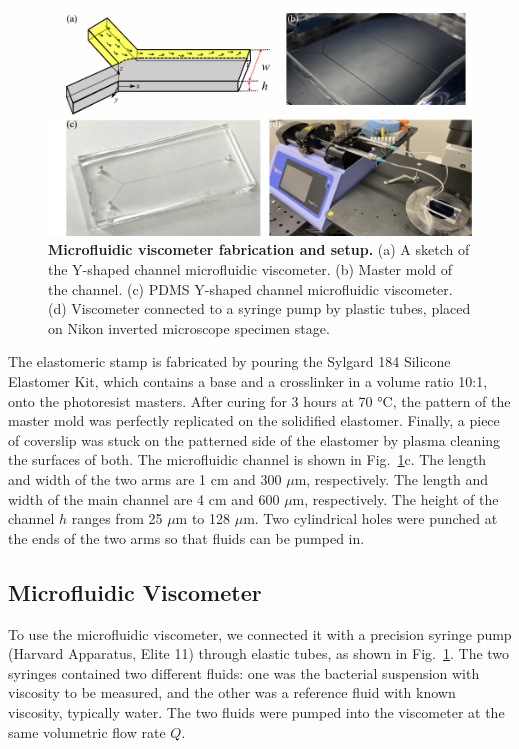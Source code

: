 \begin{figure}[!h]
	\begin{center}
	\includegraphics[width=5.5 in]{Figs/2-Exp/7.pdf}
	\end{center}
	\caption[Microfluidic viscometer fabrication and setup.]
	{
	\textbf{Microfluidic viscometer fabrication and setup.}
	(a) A sketch of the Y-shaped channel microfluidic viscometer.
	(b) Master mold of the channel.
	(c) PDMS Y-shaped channel microfluidic viscometer.
	(d) Viscometer connected to a syringe pump by plastic tubes, placed on Nikon inverted microscope specimen stage.
	}
	\label{fig:experiment-microfluidics}
\end{figure}

The elastomeric stamp is fabricated by pouring the Sylgard 184 Silicone Elastomer Kit, which contains a base and a crosslinker in a volume ratio 10:1, onto the photoresist masters. After curing for 3 hours at 70 °C, the pattern of the master mold was perfectly replicated on the solidified elastomer. Finally, a piece of coverslip was stuck on the patterned side of the elastomer by plasma cleaning the surfaces of both. The microfluidic channel is shown in Fig.~\ref{fig:experiment-microfluidics}c. The length and width of the two arms are 1 cm and 300 $\mu$m, respectively. The length and width of the main channel are 4 cm and 600 $\mu$m, respectively. The height of the channel $h$ ranges from 25 $\mu$m to 128 $\mu$m. Two cylindrical holes were punched at the ends of the two arms so that fluids can be pumped in.

\subsection{Microfluidic Viscometer}


To use the microfluidic viscometer, we connected it with a precision syringe pump (Harvard Apparatus, Elite 11) through elastic tubes, as shown in Fig.~\ref{fig:experiment-microfluidics}. The two syringes contained two different fluids: one was the bacterial suspension with viscosity to be measured, and the other was a reference fluid with known viscosity, typically water. The two fluids were pumped into the viscometer at the same volumetric flow rate $Q$.

